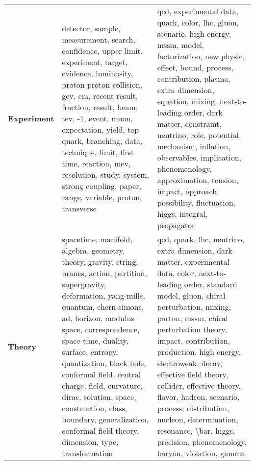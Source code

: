\begin{longtable}{p{3cm}|p{5cm}|p{5cm}}
\bottomrule
\endlastfoot
\textbf{Experiment} &                                                              detector, sample, measurement, search, confidence, upper limit, experiment, target, evidence, luminosity, proton-proton collision, gev, cm, recent result, fraction, result, beam, tev, -1, event, muon, expectation, yield, top quark, branching, data, technique, limit, first time, reaction, mev, resolution, study, system, strong coupling, paper, range, variable, proton, transverse &                                         qcd, experimental data, quark, color, lhc, gluon, scenario, high energy, mssm, model, factorization, new physic, effect, bound, process, contribution, plasma, extra dimension, equation, mixing, next-to-leading order, dark matter, constraint, neutrino, role, potential, mechanism, inflation, observables, implication, phenomenology, approximation, tension, impact, approach, possibility, fluctuation, higgs, integral, propagator \\
\textbf{Theory    } &  spacetime, manifold, algebra, geometry, theory, gravity, string, branes, action, partition, supergravity, deformation, yang-mills, quantum, chern-simons, ad, horizon, modulus space, correspondence, space-time, duality, surface, entropy, quantization, black hole, conformal field, central charge, field, curvature, dirac, solution, space, construction, class, boundary, generalization, conformal field theory, dimension, type, transformation &  qcd, quark, lhc, neutrino, extra dimension, dark matter, experimental data, color, next-to-leading order, standard model, gluon, chiral perturbation, mixing, parton, mssm, chiral perturbation theory, impact, contribution, production, high energy, electroweak, decay, effective field theory, collider, effective theory, flavor, hadron, scenario, process, distribution, nucleon, determination, resonance, \textbackslash bar, higgs, precision, phenomenology, baryon, violation, gamma \\
\end{longtable}
